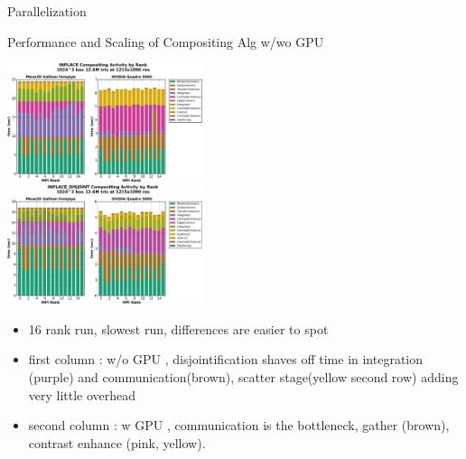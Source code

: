 \documentclass[notes]{beamer}
\begin{document}
\begin{frame}{Parallelization}
    \begin{beamerboxesrounded}{Performance and Scaling of Compositing Alg w/wo GPU}
    \begin{minipage}{0.5\linewidth}
    \begin{center}
    \includegraphics[width=2.25in]{scaling-gant-inplace-composite-gpu-mesa.png}\vspace{0.025in} \\
    \includegraphics[width=2.25in]{scaling-gant-inplace-disjoint-composite-gpu-mesa.png}
    \end{center}
    \end{minipage}
    \begin{minipage}{0.5\linewidth}
    \begin{itemize}
    \scriptsize
    \item 16 rank run, slowest run, differences are easier to spot
    \item first column : w/o GPU , disjointification shaves off time in integration (purple) and communication(brown), scatter stage(yellow second row) adding very little overhead
    \item second column : w GPU , communication is the bottleneck, gather (brown), contrast enhance (pink, yellow). 
    \end{itemize}
    \end{minipage}
    \end{beamerboxesrounded}
\end{frame}
\end{document}
